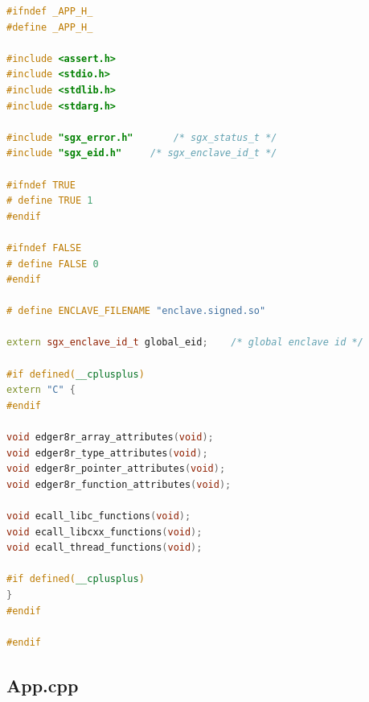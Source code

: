 \documentclass{article}
\begin{document}
\begin{lstlisting}[language=c++]
#ifndef _APP_H_
#define _APP_H_

#include <assert.h>
#include <stdio.h>
#include <stdlib.h>
#include <stdarg.h>

#include "sgx_error.h"       /* sgx_status_t */
#include "sgx_eid.h"     /* sgx_enclave_id_t */

#ifndef TRUE
# define TRUE 1
#endif

#ifndef FALSE
# define FALSE 0
#endif

# define ENCLAVE_FILENAME "enclave.signed.so"

extern sgx_enclave_id_t global_eid;    /* global enclave id */

#if defined(__cplusplus)
extern "C" {
#endif

void edger8r_array_attributes(void);
void edger8r_type_attributes(void);
void edger8r_pointer_attributes(void);
void edger8r_function_attributes(void);

void ecall_libc_functions(void);
void ecall_libcxx_functions(void);
void ecall_thread_functions(void);

#if defined(__cplusplus)
}
#endif

#endif
\end{lstlisting}

\subsection*{App.cpp}
\end{document}
